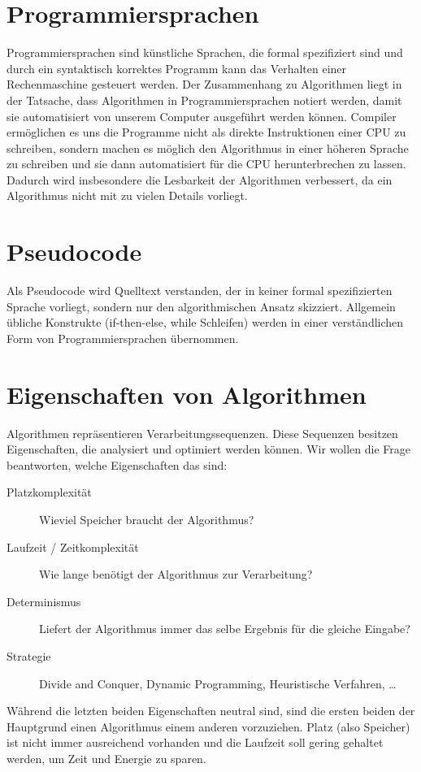 \section{Programmiersprachen}
%
Programmiersprachen sind künstliche Sprachen, die formal spezifiziert sind und durch ein syntaktisch korrektes Programm kann das Verhalten einer Rechenmaschine gesteuert werden. Der Zusammenhang zu Algorithmen liegt in der Tatsache, dass Algorithmen in Programmiersprachen notiert werden, damit sie automatisiert von unserem Computer ausgeführt werden können. Compiler ermöglichen es uns die Programme nicht als direkte Instruktionen einer CPU zu schreiben, sondern machen es möglich den Algorithmus in einer höheren Sprache zu schreiben und sie dann automatisiert für die CPU herunterbrechen zu lassen. Dadurch wird insbesondere die Lesbarkeit der Algorithmen verbessert, da ein Algorithmus nicht mit zu vielen Details vorliegt.

\section{Pseudocode}
%
Als Pseudocode wird Quelltext verstanden, der in keiner formal spezifizierten Sprache vorliegt, sondern nur den algorithmischen Ansatz skizziert. Allgemein übliche Konstrukte (if-then-else, while Schleifen) werden in einer verständlichen Form von Programmiersprachen übernommen.

\section{Eigenschaften von Algorithmen}
%
Algorithmen repräsentieren Verarbeitungssequenzen. Diese Sequenzen besitzen Eigenschaften, die analysiert und optimiert werden können. Wir wollen die Frage beantworten, welche Eigenschaften das sind:
%
\begin{description}
 \item[Platzkomplexität] Wieviel Speicher braucht der Algorithmus?
 \item[Laufzeit / Zeitkomplexität] Wie lange benötigt der Algorithmus zur Verarbeitung?
 \item[Determinismus] Liefert der Algorithmus immer das selbe Ergebnis für die gleiche Eingabe?
 \item[Strategie] Divide and Conquer, Dynamic Programming, Heuristische Verfahren, \dots
\end{description}

Während die letzten beiden Eigenschaften neutral sind, sind die ersten beiden der Hauptgrund einen Algorithmus einem anderen vorzuziehen. Platz (also Speicher) ist nicht immer ausreichend vorhanden und die Laufzeit soll gering gehaltet werden, um Zeit und Energie zu sparen.

